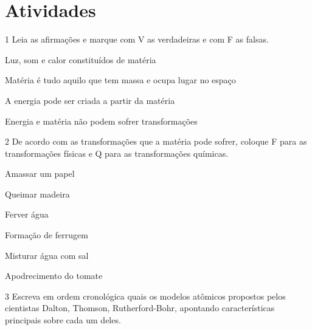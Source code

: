 \section{Atividades}

\num{1}  Leia as afirmações e marque com V as verdadeiras e com F as falsas.

\begin{boxlist}
 Luz, som e calor constituídos de matéria

 Matéria é tudo aquilo que tem massa e ocupa lugar no espaço

 A energia pode ser criada a partir da matéria

 Energia e matéria não podem sofrer transformações
\end{boxlist}


\num{2}  De acordo com as transformações que a matéria pode sofrer, coloque F para as transformações físicas e Q para as transformações químicas.

\begin{boxlist}
 Amassar um papel

 Queimar madeira

 Ferver água

 Formação de ferrugem

 Misturar água com sal

 Apodrecimento do tomate
\end{boxlist}

\pagebreak
\num{3} Escreva em ordem cronológica quais os modelos atômicos propostos pelos cientistas Dalton, Thomson, Rutherford-Bohr, apontando características principais sobre cada um deles.



